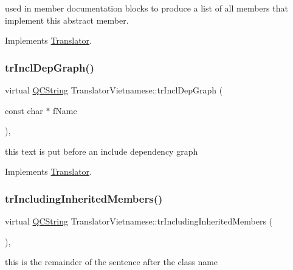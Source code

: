 used in member documentation blocks to produce a list of all members that implement this abstract member. 

Implements \mbox{\hyperlink{class_translator}{Translator}}.

\mbox{\label{class_translator_vietnamese_a31f0f3c9fe8f2cb7798b452fe1ae6420}} 
\subsubsection{\texorpdfstring{trInclDepGraph()}{trInclDepGraph()}}
{\footnotesize\ttfamily virtual \mbox{\hyperlink{class_q_c_string}{Q\+C\+String}} Translator\+Vietnamese\+::tr\+Incl\+Dep\+Graph (\begin{DoxyParamCaption}\item[{const char $\ast$}]{f\+Name }\end{DoxyParamCaption})\hspace{0.3cm}{\ttfamily [inline]}, {\ttfamily [virtual]}}

this text is put before an include dependency graph 

Implements \mbox{\hyperlink{class_translator}{Translator}}.

\mbox{\label{class_translator_vietnamese_a19ec4a9a51d691a2bd19edf770b6d2b4}} 
\subsubsection{\texorpdfstring{trIncludingInheritedMembers()}{trIncludingInheritedMembers()}}
{\footnotesize\ttfamily virtual \mbox{\hyperlink{class_q_c_string}{Q\+C\+String}} Translator\+Vietnamese\+::tr\+Including\+Inherited\+Members (\begin{DoxyParamCaption}{ }\end{DoxyParamCaption})\hspace{0.3cm}{\ttfamily [inline]}, {\ttfamily [virtual]}}

this is the remainder of the sentence after the class name 

